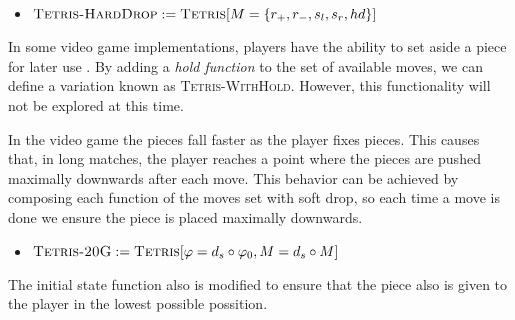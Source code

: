 \begin{itemize}
  \item $\textsc{Tetris-HardDrop} := \textsc{Tetris}[M = \{ r_+, r_-, s_l, s_r, hd \}]$
\end{itemize}

In some video game implementations, players have the ability to set aside a piece for later use \cite{WikiFandom}. By adding a \emph{hold function} to the set of available moves, we can define a variation known as \textsc{Tetris-WithHold}. However, this functionality will not be explored at this time.

\vspace{1em}


In the video game the pieces fall faster as the player fixes pieces. This causes that, in long matches, the player reaches a point where the pieces are pushed maximally downwards after each move. This behavior can be achieved by composing each function of the moves set with soft drop, so each time a move is done we ensure the piece is placed maximally downwards.   
\begin{itemize}
  \item $\textsc{Tetris-20G} := \textsc{Tetris}[\varphi = d_s \circ \varphi_0, M = d_s \circ M]$
\end{itemize}

The initial state function also is modified to ensure that the piece also is given to the player in the lowest possible possition. 
